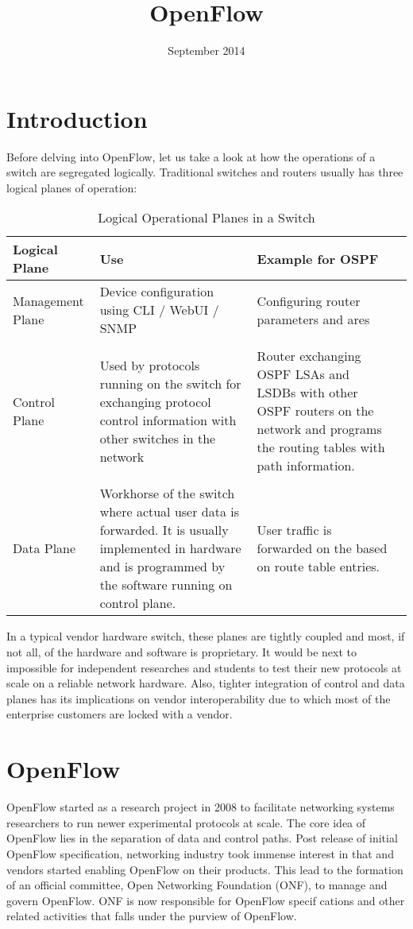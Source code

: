 \documentclass[a4paper]{article}
\title{\vspace{-4ex}\textbf{OpenFlow}\vspace{-5ex}}
\date{September 2014}
\begin{document}
\maketitle

\section{Introduction}
Before delving into OpenFlow, let us take a look at how the operations of a switch are segregated logically. Traditional switches and routers usually has three logical planes of operation:  

\begin{table}[h!]
\centering
\begin{center}
\begin{tabular}{|l|p{6cm}|p{6cm}|}
\hline
\textbf{Logical Plane} & \textbf{Use} & \textbf{Example for OSPF} \\ \hline
Management Plane & 
Device configuration using CLI / WebUI / SNMP & 
Configuring router parameters and ares \\
&  & \\
Control Plane & 
Used by protocols running on the switch for exchanging protocol control information with other switches in the network & 
Router exchanging OSPF LSAs and LSDBs with other OSPF routers on the network and programs the routing tables with path information. \\
&  & \\
Data Plane &
Workhorse of the switch where actual user data is forwarded. It is usually implemented in hardware and is programmed by the software running on control plane.  &
User traffic is forwarded on the based on route table entries.  &
\hline
\end{tabular}
\caption{Logical Operational Planes in a Switch}
\label{table:1}
\end{center}
\end{table}

In a typical vendor hardware switch, these planes are tightly coupled and most, if not all, of the hardware and software is proprietary. It would be next to impossible for independent researches and students to test their new protocols at scale on a reliable network hardware. Also, tighter integration of control and data planes has its implications on vendor interoperability due to which most of the enterprise customers are locked with a vendor.

\section{OpenFlow}
OpenFlow started as a research project in 2008 to facilitate networking systems researchers to run newer experimental protocols at scale. The core idea of OpenFlow lies in the separation of data and control paths. Post release of initial OpenFlow specification, networking industry took immense interest in that and vendors started enabling OpenFlow on their products. This lead to the formation of an official committee, Open Networking Foundation (ONF), to manage and govern OpenFlow. ONF is now responsible for OpenFlow specif cations and other related activities that falls under the purview of OpenFlow.
\end{document}

